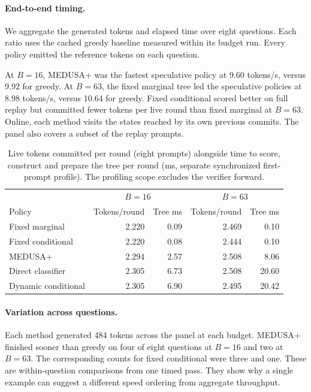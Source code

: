 \paragraph{End-to-end timing.} We aggregate the generated tokens and elapsed time over eight questions. Each ratio uses the cached greedy baseline measured within its budget run. Every policy emitted the reference tokens on each question.
\begin{table}[ht]\centering
\caption{Throughput in generated tokens per second, speed relative to cached greedy and exact output matches on the timed panel.}

\end{table}
At $B=16$, MEDUSA+ was the fastest speculative policy at 9.60 tokens/s, versus 9.92 for greedy. At $B=63$, the fixed marginal tree led the speculative policies at 8.98 tokens/s, versus 10.64 for greedy. Fixed conditional scored better on full replay but committed fewer tokens per live round than fixed marginal at $B=63$. Online, each method visits the states reached by its own previous commits. The panel also covers a subset of the replay prompts.
\begin{table}[ht]\centering
\caption{Live tokens committed per round (eight prompts) alongside time to score, construct and prepare the tree per round (ms, separate synchronized first-prompt profile). The profiling scope excludes the verifier forward.}
\begin{tabular}{lrrrr}\toprule
&\multicolumn{2}{c}{$B=16$}&\multicolumn{2}{c}{$B=63$}\\
Policy & Tokens/round & Tree ms & Tokens/round & Tree ms\\\midrule
Fixed marginal & 2.220 & 0.09 & 2.469 & 0.10\\
Fixed conditional & 2.220 & 0.08 & 2.444 & 0.10\\
MEDUSA+ & 2.294 & 2.57 & 2.508 & 8.06\\
Direct classifier & 2.305 & 6.73 & 2.508 & 20.60\\
Dynamic conditional & 2.305 & 6.90 & 2.495 & 20.42\\\bottomrule
\end{tabular}
\end{table}

\paragraph{Variation across questions.} Each method generated 484 tokens across the panel at each budget. MEDUSA+ finished sooner than greedy on four of eight questions at $B=16$ and two at $B=63$. The corresponding counts for fixed conditional were three and one. These are within-question comparisons from one timed pass. They show why a single example can suggest a different speed ordering from aggregate throughput.
